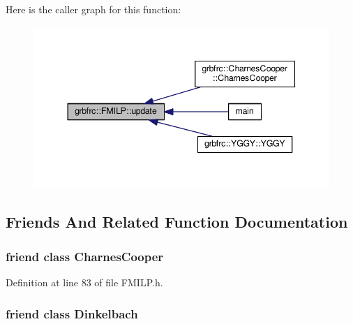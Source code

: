 Here is the caller graph for this function\+:
\nopagebreak
\begin{figure}[H]
\begin{center}
\leavevmode
\includegraphics[width=344pt]{classgrbfrc_1_1FMILP_ace026c6b2263f7f223eb7fd913f2e269_icgraph}
\end{center}
\end{figure}




\subsection{Friends And Related Function Documentation}
\subsubsection[{\texorpdfstring{Charnes\+Cooper}{CharnesCooper}}]{\setlength{\rightskip}{0pt plus 5cm}friend class {\bf Charnes\+Cooper}\hspace{0.3cm}{\ttfamily [friend]}}\hypertarget{classgrbfrc_1_1FMILP_adf7fb42f9a4a02584da1dcb6469fc521}{}\label{classgrbfrc_1_1FMILP_adf7fb42f9a4a02584da1dcb6469fc521}


Definition at line 83 of file F\+M\+I\+L\+P.\+h.

\subsubsection[{\texorpdfstring{Dinkelbach}{Dinkelbach}}]{\setlength{\rightskip}{0pt plus 5cm}friend class {\bf Dinkelbach}\hspace{0.3cm}{\ttfamily [friend]}}\hypertarget{classgrbfrc_1_1FMILP_a84e1163273507597523f840b89817919}{}\label{classgrbfrc_1_1FMILP_a84e1163273507597523f840b89817919}


